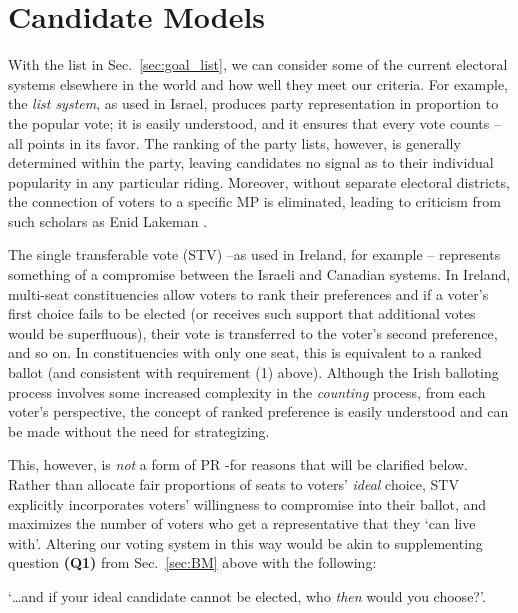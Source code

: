 \documentclass[DIV=calc, paper=a4, fontsize=11pt, twocolumn]{scrartcl}	 %
\begin{document}
\section{Candidate Models}
\label{sec:alt_models}

With the list in Sec.~\ref{sec:goal_list}, we can consider some of the current electoral systems elsewhere in the world and how well they meet our criteria. For example, the \emph{list system}, as used in Israel, produces party representation in proportion to the popular vote; it is easily understood, and it ensures that every vote counts \---all points in its favor. 
The ranking of the party lists, however, is generally determined within the party, leaving candidates no signal as to their individual popularity in any particular riding. Moreover, without separate electoral districts, the connection of voters to a specific MP is eliminated, leading to criticism from such scholars as Enid Lakeman\cite{Lakeman}
.

The single transferable vote (STV) \---as used in Ireland, for example\cite{Irish_howto_vote_doc}
\--- represents something of a compromise between the Israeli and Canadian systems. In Ireland, multi-seat constituencies allow voters to  rank their preferences and if a voter's first choice fails to be elected (or receives such support that additional votes would be superfluous), their vote is transferred to the voter's second preference, and so on. In constituencies with only one seat, this is equivalent to a ranked ballot (and consistent with requirement (1) above). 
Although the Irish balloting process involves some increased complexity in the \emph{counting} process, from each voter's perspective, the concept of ranked preference is easily understood and can be made without the need for strategizing.

This, however, is \emph{not} a form of PR \--for reasons that will be clarified below. 
Rather than allocate fair proportions of seats to voters' \emph{ideal} choice, STV explicitly incorporates voters' willingness to compromise into their ballot, and maximizes the number of voters who get a representative that they `can live with'.
Altering our voting system in this way would be akin to supplementing question \textbf{(Q1)} from Sec.~\ref{sec:BM} above with the following: 

\begin{tcolorbox}[colback=white!5!white,colframe=blue!55!black]
`\ldots and if your ideal candidate cannot be elected, who \emph{then} would you choose?'. 
\end{tcolorbox}
\end{document}
